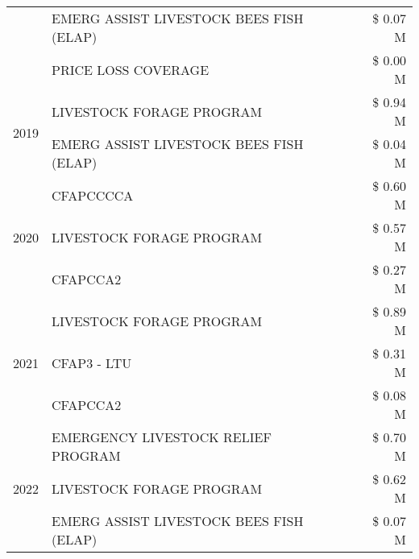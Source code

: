 \begin{tabular}{llr}
 & EMERG ASSIST LIVESTOCK BEES FISH (ELAP) & \$ 0.07 M \\
 & PRICE LOSS COVERAGE & \$ 0.00 M \\
\cline{1-3}
\multirow[t]{2}{*}{2019} & LIVESTOCK FORAGE PROGRAM & \$ 0.94 M \\
 & EMERG ASSIST LIVESTOCK BEES FISH (ELAP) & \$ 0.04 M \\
\cline{1-3}
\multirow[t]{3}{*}{2020} & CFAPCCCCA & \$ 0.60 M \\
 & LIVESTOCK FORAGE PROGRAM & \$ 0.57 M \\
 & CFAPCCA2 & \$ 0.27 M \\
\cline{1-3}
\multirow[t]{3}{*}{2021} & LIVESTOCK FORAGE PROGRAM & \$ 0.89 M \\
 & CFAP3 - LTU & \$ 0.31 M \\
 & CFAPCCA2 & \$ 0.08 M \\
\cline{1-3}
\multirow[t]{3}{*}{2022} & EMERGENCY LIVESTOCK RELIEF PROGRAM & \$ 0.70 M \\
 & LIVESTOCK FORAGE PROGRAM & \$ 0.62 M \\
 & EMERG ASSIST LIVESTOCK BEES FISH (ELAP) & \$ 0.07 M \\
\cline{1-3}
\bottomrule
\end{tabular}
